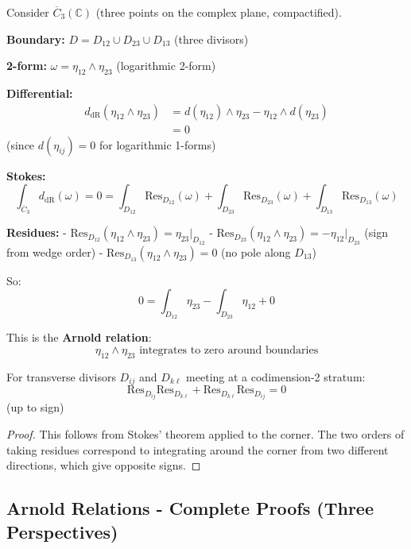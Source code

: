 \begin{example}\label{ex:stokes-three-points}
Consider $\overline{C}_3(\mathbb{C})$ (three points on the complex plane, compactified).

\textbf{Boundary:} $D = D_{12} \cup D_{23} \cup D_{13}$ (three divisors)

\textbf{2-form:} $\omega = \eta_{12} \wedge \eta_{23}$ (logarithmic 2-form)

\textbf{Differential:} 
\begin{align*}
d_{\text{dR}}(\eta_{12} \wedge \eta_{23}) &= d(\eta_{12}) \wedge \eta_{23} - \eta_{12} \wedge d(\eta_{23}) \\
&= 0
\end{align*}
(since $d(\eta_{ij}) = 0$ for logarithmic 1-forms)

\textbf{Stokes:}
$$\int_{\overline{C}_3} d_{\text{dR}}(\omega) = 0 = \int_{D_{12}} \text{Res}_{D_{12}}(\omega) + \int_{D_{23}} \text{Res}_{D_{23}}(\omega) + \int_{D_{13}} \text{Res}_{D_{13}}(\omega)$$

\textbf{Residues:}
- $\text{Res}_{D_{12}}(\eta_{12} \wedge \eta_{23}) = \eta_{23}|_{D_{12}}$
- $\text{Res}_{D_{23}}(\eta_{12} \wedge \eta_{23}) = -\eta_{12}|_{D_{23}}$ (sign from wedge order)
- $\text{Res}_{D_{13}}(\eta_{12} \wedge \eta_{23}) = 0$ (no pole along $D_{13}$)

So:
$$0 = \int_{D_{12}} \eta_{23} - \int_{D_{23}} \eta_{12} + 0$$

This is the \textbf{Arnold relation}:
$$\eta_{12} \wedge \eta_{23} \text{ integrates to zero around boundaries}$$
\end{example}

\begin{corollary}\label{cor:residues-anticommute}
For transverse divisors $D_{ij}$ and $D_{k\ell}$ meeting at a codimension-2 stratum:
$$\text{Res}_{D_{ij}} \text{Res}_{D_{k\ell}} + \text{Res}_{D_{k\ell}} \text{Res}_{D_{ij}} = 0$$
(up to sign)
\end{corollary}

\begin{proof}
This follows from Stokes' theorem applied to the corner. The two orders of taking residues correspond to integrating around the corner from two different directions, which give opposite signs.
\end{proof}

\subsection{Arnold Relations - Complete Proofs (Three Perspectives)}

